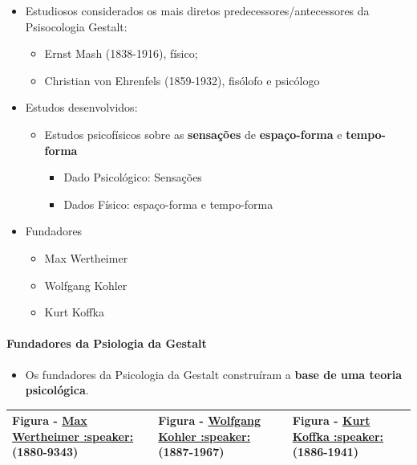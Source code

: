 \documentclass[
]{book}
\providecommand{\tightlist}{%
  \setlength{\itemsep}{0pt}\setlength{\parskip}{0pt}}
\begin{document}
\begin{itemize}
\tightlist
\item
  Estudiosos considerados os mais diretos predecessores/antecessores da
  Psisocologia Gestalt:

  \begin{itemize}
  \tightlist
  \item
    Ernst Mash (1838-1916), físico;
  \item
    Christian von Ehrenfels (1859-1932), fisólofo e psicólogo
  \end{itemize}
\item
  Estudos desenvolvidos:

  \begin{itemize}
  \tightlist
  \item
    Estudos psicofísicos sobre as \textbf{sensações} de
    \textbf{espaço-forma} e \textbf{tempo-forma}

    \begin{itemize}
    \tightlist
    \item
      Dado Psicológico: Sensações
    \item
      Dados Físico: espaço-forma e tempo-forma
    \end{itemize}
  \end{itemize}
\item
  Fundadores

  \begin{itemize}
  \tightlist
  \item
    Max Wertheimer
  \item
    Wolfgang Kohler
  \item
    Kurt Koffka
  \end{itemize}
\end{itemize}

\hypertarget{fundadores-da-psiologia-da-gestalt}{%
\paragraph{Fundadores da Psiologia da
Gestalt}\label{fundadores-da-psiologia-da-gestalt}}

\begin{itemize}
\tightlist
\item
  Os fundadores da Psicologia da Gestalt construíram a \textbf{base de
  uma teoria psicológica}.
\end{itemize}

\begin{longtable}[]{@{}
  >{\centering\arraybackslash}p{}
  >{\centering\arraybackslash}p{}
  >{\centering\arraybackslash}p{}@{}}
\toprule()
\endhead
Figura -
\href{https://translate.google.com/?sl=hu\&tl=pt\&text=Max\%20Wertheimer\&op=translate}{Max
Wertheimer :speaker:} (1880-9343) & Figura -
\href{https://translate.google.com/?sl=de\&tl=pt\&text=Wolfgang\%20Kohler\&op=translate}{Wolfgang
Kohler :speaker:}(1887-1967) & Figura -
\href{https://translate.google.com/?sl=de\&tl=pt\&text=Kurt\%20Koffka\&op=translate}{Kurt
Koffka :speaker:}(1886-1941) \\
\bottomrule()
\end{longtable}
\end{document}
